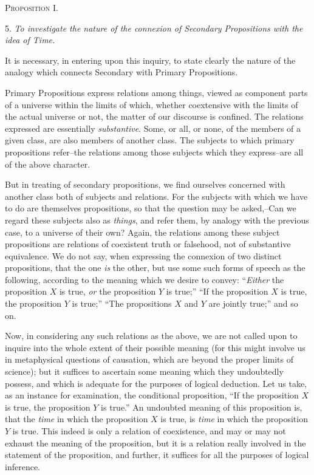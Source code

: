 \documentclass[oneside]{book}
\begin{document}
\begin{center}
\textsc{Proposition I.}
\end{center}

5. \textit{To investigate the nature of the connexion of Secondary Propositions
with the idea of Time.}

It is necessary, in entering upon this inquiry, to state clearly
the nature of the analogy which connects Secondary with Primary
Propositions.

Primary Propositions express relations among things, viewed
as component parts of a universe within the limits of which,
whether coextensive with the limits of the actual universe or
not, the matter of our discourse is confined. The relations expressed
are essentially \textit{substantive}. Some, or all, or none, of the
members of a given class, are also members of another class.
The subjects to which primary propositions refer--the relations
among those subjects which they express--are all of the above
character.

But in treating of secondary propositions, we find ourselves concerned
with another class both of subjects and relations. For the
subjects with which we have to do are themselves propositions, so
that the question may be asked,--Can we regard these subjects
also as \textit{things}, and refer them, by analogy with the previous
case, to a universe of their own? Again, the relations among
these subject propositions are relations of coexistent truth or
falsehood, not of substantive equivalence. We do not say, when
expressing the connexion of two distinct propositions, that the
one \textit{is} the other, but use some such forms of speech as the
following, according to the meaning which we desire to convey:
``\textit{Either} the proposition $X$ is true, \textit{or} the proposition $Y$ is true;''
``If the proposition $X$ is true, the proposition $Y$ is true;'' ``The
propositions $X$ and $Y$ are jointly true;'' and so on.

Now, in considering any such relations as the above, we are
not called upon to inquire into the whole extent of their possible
meaning (for this might involve us in metaphysical questions of
causation, which are beyond the proper limits of science); but it
suffices to ascertain some meaning which they undoubtedly
possess, and which is adequate for the purposes of logical deduction.
Let us take, as an instance for examination, the conditional
proposition, ``If the proposition $X$ is true, the proposition $Y$ is
true.'' An undoubted meaning of this proposition is, that the
\textit{time} in which the proposition $X$ is true, is \textit{time} in which the
proposition $Y$ is true. This indeed is only a relation of coexistence,
and may or may not exhaust the meaning of the proposition, but
it is a relation really involved in the statement of the proposition,
and further, it suffices for all the purposes of logical inference.
\end{document}
